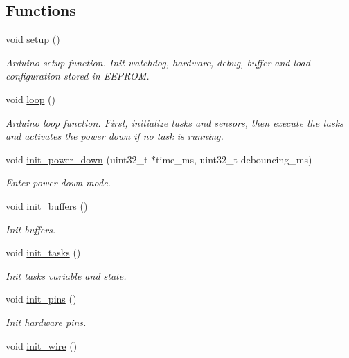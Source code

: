 \subsection*{Functions}
\begin{DoxyCompactItemize}
\item 
void \hyperlink{rmap_8ino_a4fc01d736fe50cf5b977f755b675f11d}{setup} ()
\begin{DoxyCompactList}\small\item\em Arduino setup function. Init watchdog, hardware, debug, buffer and load configuration stored in E\+E\+P\+R\+OM. \end{DoxyCompactList}\item 
void \hyperlink{rmap_8ino_afe461d27b9c48d5921c00d521181f12f}{loop} ()
\begin{DoxyCompactList}\small\item\em Arduino loop function. First, initialize tasks and sensors, then execute the tasks and activates the power down if no task is running. \end{DoxyCompactList}\item 
void \hyperlink{rmap_8ino_afb98a0f07c30784284f48271ffe02b97}{init\+\_\+power\+\_\+down} (uint32\+\_\+t $\ast$time\+\_\+ms, uint32\+\_\+t debouncing\+\_\+ms)
\begin{DoxyCompactList}\small\item\em Enter power down mode. \end{DoxyCompactList}\item 
void \hyperlink{rmap_8ino_ad241cc00b1a92e6d85827df96778e442}{init\+\_\+buffers} ()
\begin{DoxyCompactList}\small\item\em Init buffers. \end{DoxyCompactList}\item 
void \hyperlink{rmap_8ino_ab4bf0a3d77da083f131d3fa35a37d2b1}{init\+\_\+tasks} ()
\begin{DoxyCompactList}\small\item\em Init tasks variable and state. \end{DoxyCompactList}\item 
void \hyperlink{rmap_8ino_ad8b80a0c08f928106018edd6ea435b95}{init\+\_\+pins} ()
\begin{DoxyCompactList}\small\item\em Init hardware pins. \end{DoxyCompactList}\item 
void \hyperlink{rmap_8ino_a2441543100bf8421f56edd622a2c1d9a}{init\+\_\+wire} ()

\end{DoxyCompactItemize}
